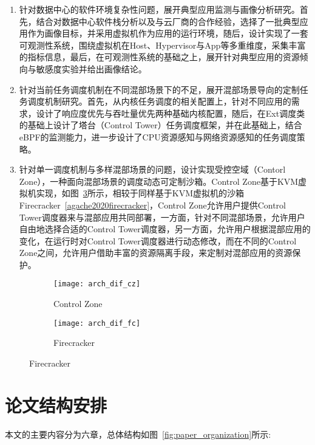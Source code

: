 \begin{enumerate}
    \item 针对数据中心的软件环境复杂性问题，展开典型应用监测与画像分析研究。首先，结合对数据中心软件栈分析以及与云厂商的合作经验，选择了一批典型应用作为画像目标，并采用虚拟机作为应用的运行环境，随后，设计实现了一套可观测性系统，围绕虚拟机在Host、Hypervisor与App等多重维度，采集丰富的指标信息，最后，在可观测性系统的基础之上，展开针对典型应用的资源倾向与敏感度实验并给出画像结论。
    \item 针对当前任务调度机制在不同混部场景下的不足，展开混部场景导向的定制任务调度机制研究。首先，从内核任务调度的相关配置上，针对不同应用的需求，设计了响应度优先与吞吐量优先两种基础内核配置，随后，在Ext调度类的基础上设计了塔台（Control Tower）任务调度框架，并在此基础上，结合eBPF的监测能力，进一步设计了CPU资源感知与网络资源感知的任务调度策略。
    \item 针对单一调度机制与多样混部场景的问题，设计实现受控空域（Contorl Zone），一种面向混部场景的调度动态可定制沙箱。Control Zone基于KVM虚拟机实现，如图~\ref{fig:arch_dif}所示，相较于同样基于KVM虚拟机的沙箱Firecracker~\ref{agache2020firecracker}，Control Zone允许用户提供Control Tower调度器来与混部应用共同部署，一方面，针对不同混部场景，允许用户自由地选择合适的Control Tower调度器，另一方面，允许用户根据混部应用的变化，在运行时对Control Tower调度器进行动态修改，而在不同的Control Zone之间，允许用户借助丰富的资源隔离手段，来定制对混部应用的资源保护。
\end{enumerate}

\begin{figure}[!htbp]
    \centering
    \begin{subfigure}[b]{0.45\textwidth}
        \texttt{[image: arch\_dif\_cz]}
        \caption{Control Zone}
        \label{fig:arch_dif_cz}
    \end{subfigure}
    \hfill
    \begin{subfigure}[b]{0.45\textwidth}
        \texttt{[image: arch\_dif\_fc]}
        \caption{Firecracker}
        \label{fig:arch_dif_fc}
    \end{subfigure}
\label{fig:arch_dif}
\end{figure}

\section{论文结构安排}

本文的主要内容分为六章，总体结构如图~\ref{fig:paper_organization}所示:

